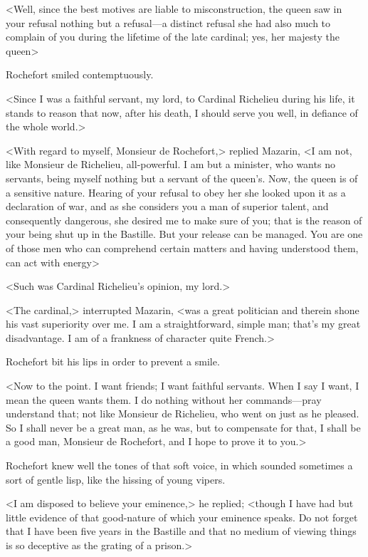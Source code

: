 <Well, since the best motives are liable to misconstruction, the queen saw in your refusal nothing but a refusal—a distinct refusal she had also much to complain of you during the lifetime of the late cardinal; yes, her majesty the queen\longdash>

Rochefort smiled contemptuously.

<Since I was a faithful servant, my lord, to Cardinal Richelieu during his life, it stands to reason that now, after his death, I should serve you well, in defiance of the whole world.>

<With regard to myself, Monsieur de Rochefort,> replied Mazarin, <I am not, like Monsieur de Richelieu, all-powerful. I am but a minister, who wants no servants, being myself nothing but a servant of the queen's. Now, the queen is of a sensitive nature. Hearing of your refusal to obey her she looked upon it as a declaration of war, and as she considers you a man of superior talent, and consequently dangerous, she desired me to make sure of you; that is the reason of your being shut up in the Bastille. But your release can be managed. You are one of those men who can comprehend certain matters and having understood them, can act with energy\longdash>

<Such was Cardinal Richelieu's opinion, my lord.>

<The cardinal,> interrupted Mazarin, <was a great politician and therein shone his vast superiority over me. I am a straightforward, simple man; that's my great disadvantage. I am of a frankness of character quite French.>

Rochefort bit his lips in order to prevent a smile.

<Now to the point. I want friends; I want faithful servants. When I say I want, I mean the queen wants them. I do nothing without her commands—pray understand that; not like Monsieur de Richelieu, who went on just as he pleased. So I shall never be a great man, as he was, but to compensate for that, I shall be a good man, Monsieur de Rochefort, and I hope to prove it to you.>

Rochefort knew well the tones of that soft voice, in which sounded sometimes a sort of gentle lisp, like the hissing of young vipers.

<I am disposed to believe your eminence,> he replied; <though I have had but little evidence of that good-nature of which your eminence speaks. Do not forget that I have been five years in the Bastille and that no medium of viewing things is so deceptive as the grating of a prison.>

